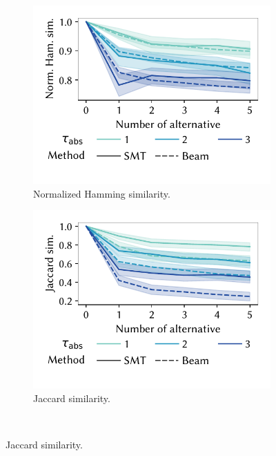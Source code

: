 \documentclass[acmsmall]{acmart} %
\theoremstyle{acmplain}
\theoremstyle{acmdefinition}
\begin{document}
\begin{figure}[t]
	\centering
	\begin{subfigure}[t]{0.48\textwidth}
		\centering
		\includegraphics[width=\textwidth, trim=10 25 10 10, clip]{plots/csd-alternatives-hamming.pdf}
		\caption{Normalized Hamming similarity.}
		\label{fig:csd:alternatives-hamming}
	\end{subfigure}
	\hfill
	\begin{subfigure}[t]{0.48\textwidth}
		\centering
		\includegraphics[width=\textwidth, trim=10 25 10 10, clip]{plots/csd-alternatives-jaccard.pdf}
		\caption{Jaccard similarity.}
		\label{fig:csd:alternatives-jaccard}
	\end{subfigure}
	\\ \vspace{\baselineskip}

\end{figure}
\end{document}

